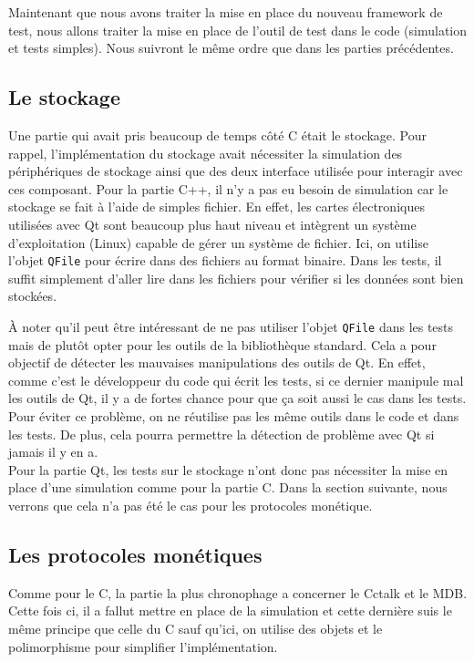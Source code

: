 \documentclass[a4paper]{article}
\begin{document}
Maintenant que nous avons traiter la mise en place du nouveau framework de test,
nous allons traiter la mise en place de l'outil de test dans le code (simulation
et tests simples). Nous suivront le même ordre que dans les parties précédentes.

\subsection{Le stockage}

Une partie qui avait pris beaucoup de temps côté C était le stockage. Pour
rappel, l'implémentation du stockage avait nécessiter la simulation des
périphériques de stockage ainsi que des deux interface utilisée pour interagir
avec ces composant. Pour la partie C++, il n'y a pas eu besoin de simulation car
le stockage se fait à l'aide de simples fichier. En effet, les cartes
électroniques utilisées avec Qt sont beaucoup plus haut niveau et intègrent un
système d'exploitation (Linux) capable de gérer un système de fichier. Ici, on
utilise l'objet \verb|QFile| pour écrire dans des fichiers au format binaire.
Dans les tests, il suffit simplement d'aller lire dans les fichiers pour
vérifier si les données sont bien stockées.

À noter qu'il peut être intéressant de ne pas utiliser l'objet \verb|QFile|
dans les tests mais de plutôt opter pour les outils de la bibliothèque
standard. Cela a pour objectif de détecter les mauvaises manipulations des
outils de Qt. En effet, comme c'est le développeur du code qui écrit les tests,
si ce dernier manipule mal les outils de Qt, il y a de fortes chance pour que ça
soit aussi le cas dans les tests. Pour éviter ce problème, on ne réutilise pas
les même outils dans le code et dans les tests. De plus, cela pourra permettre
la détection de problème avec Qt si jamais il y en a.\\

Pour la partie Qt, les tests sur le stockage n'ont donc pas nécessiter la mise
en place d'une simulation comme pour la partie C. Dans la section suivante, nous
verrons que cela n'a pas été le cas pour les protocoles monétique.

\subsection{Les protocoles monétiques}

Comme pour le C, la partie la plus chronophage a concerner le Cctalk et le MDB.
Cette fois ci, il a fallut mettre en place de la simulation et cette dernière
suis le même principe que celle du C sauf qu'ici, on utilise des objets et le
polimorphisme pour simplifier l'implémentation.
\end{document}
